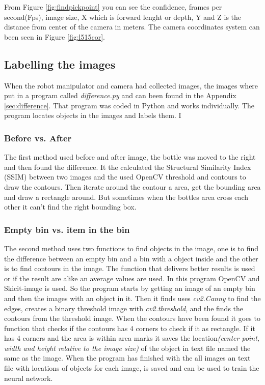From Figure \ref{fig:findpickpoint} you can see the confidence, frames per second(Fps), image size, X which is forward lenght or depth, Y and Z is the distance from center of the camera in meters. 
The camera coordinates system can been seen in Figure \ref{fig:l515cor}.


\subsection{Labelling the images}\label{labelimg}
When the robot manipulator and camera had collected images, the images where put in a program called \textit{difference.py} and can been found in the Appendix \ref{sec:difference}. That program was coded in Python and works individually. The program locates objects in the images and labels them. I


\subsubsection*{Before vs. After}
The first method used before and after image, the bottle was moved to the right and then found the difference. It the calculated the Structural Similarity Index (SSIM) between two images and the used OpenCV threshold and contours to draw the contours. Then iterate around the contour a area, get the bounding area and draw a rectangle around. But sometimes when the bottles area cross each other it can't find the right bounding box. 
\subsubsection*{Empty bin vs. item in the bin}
The second method uses two functions to find objects in the image, one is to find the difference between an empty bin and a bin with a object inside and the other is to find contours in the image. 
The function that delivers better results is used or if the result are alike an average values are used. 
In this program OpenCV and Skicit-image is used. 
So the program starts by getting an image of an empty bin and then the images with an object in it. 
Then it finds uses \textit{cv2.Canny} to find the edges, creates a binary threshold image with \textit{cv2.threshold}, and the finds the contours from the threshold image.  
When the contours have been found it goes to function that checks if the contours has 4 corners to check if it as rectangle. 
If it has 4 corners and the area is within area marks it saves the location\textit{(center point, width and height relative to the image size)} of the object in text file named the same as the image. 
When the program has finished with the all images an text file with locations of objects for each image, is saved and can be used to train the neural network.

